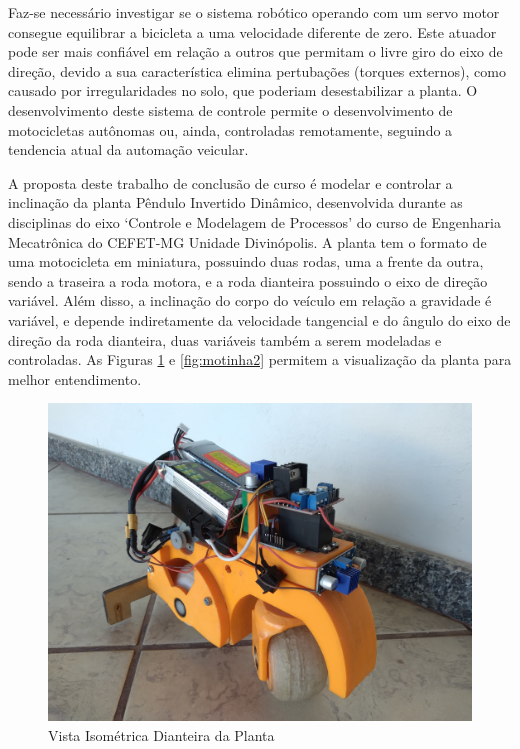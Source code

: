         Faz-se necessário investigar se o sistema robótico operando com um servo motor consegue equilibrar a bicicleta a uma velocidade diferente de zero. Este atuador pode ser mais confiável em relação a outros que permitam o livre giro do eixo de direção, devido a sua característica elimina pertubações (torques externos), como causado por irregularidades no solo, que poderiam desestabilizar a planta. O desenvolvimento deste sistema de controle permite o desenvolvimento de motocicletas autônomas ou, ainda, controladas remotamente, seguindo a tendencia atual da automação veicular.
        
        A proposta deste trabalho de conclusão de curso é modelar e controlar a inclinação da planta Pêndulo Invertido Dinâmico, desenvolvida durante as disciplinas do eixo `Controle e Modelagem de Processos' do curso de Engenharia Mecatrônica do CEFET-MG Unidade Divinópolis. A planta tem o formato de uma motocicleta em miniatura, possuindo duas rodas, uma a frente da outra, sendo a traseira a roda motora, e a roda dianteira possuindo o eixo de direção variável. Além disso, a inclinação do corpo do veículo em relação a gravidade é variável, e depende indiretamente da velocidade tangencial e do ângulo do eixo de direção da roda dianteira, duas variáveis também a serem modeladas e controladas. As Figuras \ref{fig:motinha1} e \ref{fig:motinha2} permitem a visualização da planta para melhor entendimento.
        
        \begin{figure}[!htb] 
            \centering
            \includegraphics[width=13cm]{Imagens/MotinhaIsometricaDianteira.jpg}{%
                \small
                \centering
                \caption{Vista Isométrica Dianteira da Planta}
                \label{fig:motinha1}}
        \end{figure}
        
